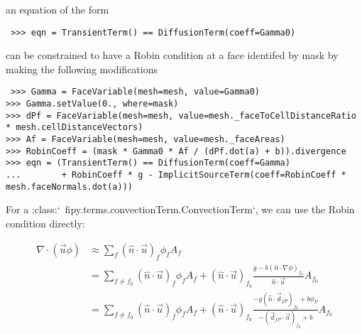 \documentclass{article}
\begin{document}
an equation of the form
\begin{verbatim}
 >>> eqn = TransientTerm() == DiffusionTerm(coeff=Gamma0)
\end{verbatim} 

can be constrained to have a Robin condition at a face identifed by mask by making the following modifications

\begin{verbatim}
 >>> Gamma = FaceVariable(mesh=mesh, value=Gamma0)
>>> Gamma.setValue(0., where=mask)
>>> dPf = FaceVariable(mesh=mesh, value=mesh._faceToCellDistanceRatio * mesh.cellDistanceVectors)
>>> Af = FaceVariable(mesh=mesh, value=mesh._faceAreas)
>>> RobinCoeff = (mask * Gamma0 * Af / (dPf.dot(a) + b)).divergence
>>> eqn = (TransientTerm() == DiffusionTerm(coeff=Gamma)
...        + RobinCoeff * g - ImplicitSourceTerm(coeff=RobinCoeff * mesh.faceNormals.dot(a)))
\end{verbatim} 

For a :class:`~fipy.terms.convectionTerm.ConvectionTerm`, we can use the Robin condition directly:

\begin{equation*}
\begin{aligned}
    \nabla\cdot\left(\vec{u}\phi\right) &\approx
    \sum_f \left(\hat{n}\cdot\vec{u}\right)_f \phi_f A_f \\
    &= \sum_{f\neq f_0} \left(\hat{n}\cdot\vec{u}\right)_f \phi_f A_f
    + \left(\hat{n}\cdot\vec{u}\right)_{f_0} \frac{g - b \left(\hat{n}\cdot\nabla\phi\right)_{f_0}}{\hat{n}\cdot\vec{a}} A_{f_0} \\
    &= \sum_{f\neq f_0} \left(\hat{n}\cdot\vec{u}\right)_f \phi_f A_f
    + \left(\hat{n}\cdot\vec{u}\right)_{f_0}
         \frac{-g \left(\hat{n}\cdot\vec{d}_{fP}\right)_{f_0} + b\phi_P}
              {- \left(\vec{d}_{fP}\cdot\vec{a}\right)_{f_0} + b} A_{f_0}
\end{aligned}
\end{equation*} 
\end{document}
